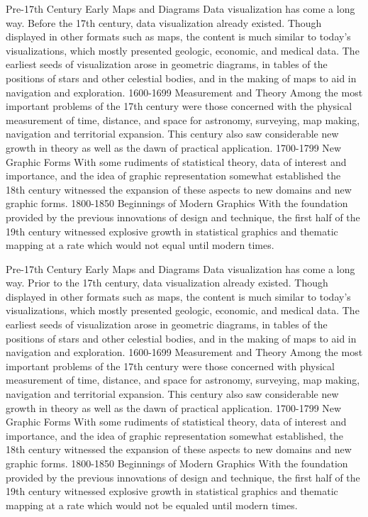 \documentclass[]{book}
\theoremstyle{definition}
\theoremstyle{definition}
\theoremstyle{definition}
\theoremstyle{remark}
\begin{document}
Pre-17th Century \textbar{} Early Maps and Diagrams \textbar{} Data
visualization has come a long way. Before the 17th century, data
visualization already existed. Though displayed in other formats such as
maps, the content is much similar to today's visualizations, which
mostly presented geologic, economic, and medical data. The earliest
seeds of visualization arose in geometric diagrams, in tables of the
positions of stars and other celestial bodies, and in the making of maps
to aid in navigation and exploration. 1600-1699 \textbar{} Measurement
and Theory \textbar{} Among the most important problems of the 17th
century were those concerned with the physical measurement of time,
distance, and space for astronomy, surveying, map making, navigation and
territorial expansion. This century also saw considerable new growth in
theory as well as the dawn of practical application. 1700-1799
\textbar{} New Graphic Forms \textbar{} With some rudiments of
statistical theory, data of interest and importance, and the idea of
graphic representation somewhat established the 18th century witnessed
the expansion of these aspects to new domains and new graphic forms.
1800-1850 \textbar{} Beginnings of Modern Graphics \textbar{} With the
foundation provided by the previous innovations of design and technique,
the first half of the 19th century witnessed explosive growth in
statistical graphics and thematic mapping at a rate which would not
equal until modern times.

Pre-17th Century \textbar{} Early Maps and Diagrams \textbar{} Data
visualization has come a long way. Prior to the 17th century, data
visualization already existed. Though displayed in other formats such as
maps, the content is much similar to today's visualizations, which
mostly presented geologic, economic, and medical data. The earliest
seeds of visualization arose in geometric diagrams, in tables of the
positions of stars and other celestial bodies, and in the making of maps
to aid in navigation and exploration. 1600-1699 \textbar{} Measurement
and Theory \textbar{} Among the most important problems of the 17th
century were those concerned with physical measurement of time,
distance, and space for astronomy, surveying, map making, navigation and
territorial expansion. This century also saw considerable new growth in
theory as well as the dawn of practical application. 1700-1799
\textbar{} New Graphic Forms \textbar{} With some rudiments of
statistical theory, data of interest and importance, and the idea of
graphic representation somewhat established, the 18th century witnessed
the expansion of these aspects to new domains and new graphic forms.
1800-1850 \textbar{} Beginnings of Modern Graphics \textbar{} With the
foundation provided by the previous innovations of design and technique,
the first half of the 19th century witnessed explosive growth in
statistical graphics and thematic mapping at a rate which would not be
equaled until modern times.
\end{document}
